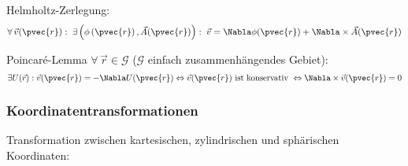 \documentclass[11pt]{article}
\numberwithin{equation}{section}
\begin{document}
        Helmholtz-Zerlegung:
    		\begin{equation}
          \forall \,\vec{v}(\pvec{r}):\; \exists\left(\phi\left(\pvec{r}\right),\vec{A}(\pvec{r})\right):\;\vec{v} = \Nabla\phi(\pvec{r}) + \Nabla\times\vec{A}(\pvec{r})
    		\end{equation}

        Poincaré-Lemma $\forall\, \vec{r}\in\mathcal{G}$ ($\mathcal{G}$ einfach zusammenhängendes Gebiet):
        \begin{equation}
          \exists U(\vec{r}): \vec{v}(\pvec{r}) = -\Nabla U(\pvec{r})
          \Leftrightarrow \vec{v}(\pvec{r}) \text{ ist konservativ }
          \Leftrightarrow \Nabla\times\vec{v}(\pvec{r}) = 0
        \end{equation}

      \subsubsection{Koordinatentransformationen}
        Transformation zwischen kartesischen, zylindrischen und sphärischen Koordinaten:
\end{document}
